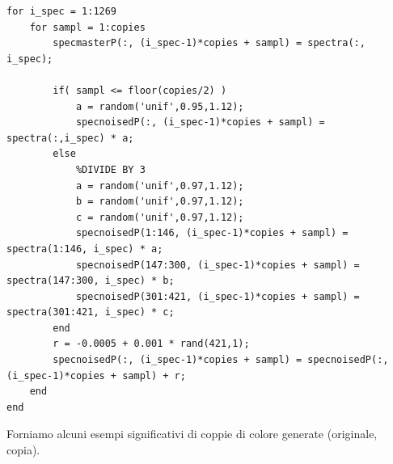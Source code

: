 \begin{lstlisting}
for i_spec = 1:1269
    for sampl = 1:copies
        specmasterP(:, (i_spec-1)*copies + sampl) = spectra(:, i_spec);

        if( sampl <= floor(copies/2) )
        	a = random('unif',0.95,1.12);
            specnoisedP(:, (i_spec-1)*copies + sampl) = spectra(:,i_spec) * a;
        else
            %DIVIDE BY 3
            a = random('unif',0.97,1.12);
            b = random('unif',0.97,1.12);
            c = random('unif',0.97,1.12);
            specnoisedP(1:146, (i_spec-1)*copies + sampl) = spectra(1:146, i_spec) * a;
            specnoisedP(147:300, (i_spec-1)*copies + sampl) = spectra(147:300, i_spec) * b;
            specnoisedP(301:421, (i_spec-1)*copies + sampl) = spectra(301:421, i_spec) * c;
        end 
        r = -0.0005 + 0.001 * rand(421,1);
        specnoisedP(:, (i_spec-1)*copies + sampl) = specnoisedP(:, (i_spec-1)*copies + sampl) + r;
    end
end
\end{lstlisting}
Forniamo alcuni esempi significativi di coppie di colore generate (originale, copia).

